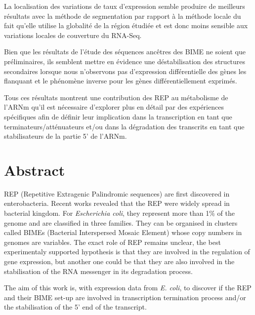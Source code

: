 \documentclass[12pt,a4paper]{report}
\begin{document}
La localisation des variations de taux d'expression semble produire de meilleurs résultats avec la méthode de segmentation par rapport à la méthode locale du fait qu'elle utilise la globalité de la région étudiée et est donc moins sensible aux variations locales de couverture du RNA-Seq. 

Bien que les résultats de l'étude des séquences ancêtres des BIME ne soient que préliminaires, ils semblent mettre en évidence une déstabilisation des structures secondaires lorsque nous n'observons pas d'expression différentielle des gènes les flanquant et le phénomène inverse pour les gènes différentiellement exprimés.

Tous ces résultats montrent une contribution des REP au métabolisme de l'ARNm qu'il est nécessaire d'explorer plus en détail par des expériences spécifiques afin de définir leur implication dans la transcription en tant que terminateurs/atténuateurs et/ou dans la dégradation des transcrits en tant que stabilisateurs de la partie 5' de l'ARNm.


\chapter*{Abstract}
\thispagestyle{empty}

REP (Repetitive Extragenic Palindromic sequences) are first discovered in enterobacteria. Recent works revealed that the REP were widely spread in bacterial kingdom. For \textit{Escherichia coli}, they represent more than 1\% of the genome and are classified in three families. They can be organised in clusters called BIMEs (Bacterial Interspersed Mosaic Element) whose copy numbers in genomes are variables. The exact role of REP remains unclear, the best experimentaly supported hypothesis is that they are involved in the regulation of gene expression, but another one could be that they are also involved in the stabilisation of the RNA messenger in its degradation process.

The aim of this work is, with expression data from \textit{E. coli}, to discover if the REP and their BIME set-up are involved in transcription termination process and/or the stabilisation of the 5' end of the transcript.
\end{document}
